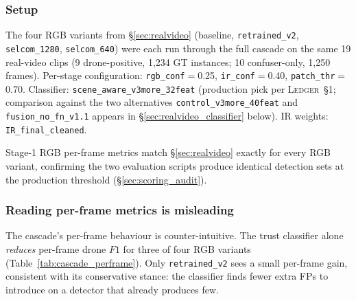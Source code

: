 \subsubsection{Setup}
The four RGB variants from \S\ref{sec:realvideo} (baseline, \texttt{retrained\_v2}, \texttt{selcom\_1280}, \texttt{selcom\_640}) were each run through the full cascade on the same 19 real-video clips (9 drone-positive, 1{,}234 GT instances; 10 confuser-only, 1{,}250 frames). Per-stage configuration: \texttt{rgb\_conf}$=$0.25, \texttt{ir\_conf}$=$0.40, \texttt{patch\_thr}$=$0.70. Classifier: \texttt{scene\_aware\_v3more\_32feat} (production pick per \textsc{Ledger}~\S1; comparison against the two alternatives \texttt{control\_v3more\_40feat} and \texttt{fusion\_no\_fn\_v1.1} appears in \S\ref{sec:realvideo_classifier} below). IR weights: \texttt{IR\_final\_cleaned}.

Stage-1 RGB per-frame metrics match \S\ref{sec:realvideo} exactly for every RGB variant, confirming the two evaluation scripts produce identical detection sets at the production threshold (\S\ref{sec:scoring_audit}).

\subsubsection{Reading per-frame metrics is misleading}

The cascade's per-frame behaviour is counter-intuitive. The trust classifier alone \emph{reduces} per-frame drone $F1$ for three of four RGB variants (Table~\ref{tab:cascade_perframe}). Only \texttt{retrained\_v2} sees a small per-frame gain, consistent with its conservative stance: the classifier finds fewer extra FPs to introduce on a detector that already produces few.

